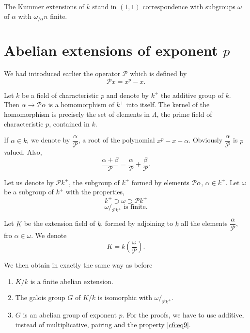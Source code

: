\begin{thm}\label{c6:thm14}%
The Kummer extensions of $k$ stand in $(1,1)$ correspondence with
  subgroups $\omega$ of $\alpha$ with $\omega_{/{\alpha}}n$ finite. 
\end{thm}


\section{Abelian extensions of exponent \texorpdfstring{$p$}{p}}\label{c6:s7}\pageoriginale %

We had introduced earlier the operator $\mathscr{P}$ which is defined
by 
$$
\mathscr{P} x =x^p-x. 
$$

Let $k$ be a field of characteristic $p$ and denote by $k^+$ the
additive group of $k$. Then $\alpha \to \mathscr{P} \alpha$ is a
homomorphism of $k^+$ into itself. The kernel of the homomorphism is
precisely the set of elements in $\Lambda$, the prime field of
characteristic $p$, contained in $k$. 

If $\alpha \in k$, we denote by $\dfrac{\alpha}{\mathscr{P}}$, a root
of the polynomial $x^p-x- \alpha$. Obviously
$\dfrac{\alpha}{\mathscr{P}}$ is $p$ valued. Also, 
\begin{equation*}
\frac{\alpha+ \beta}{\mathscr{P}}=\frac{\alpha}{\mathscr{P}}+\frac{
  \beta}{\mathscr{P}}. \tag{9}\label{c6:eq9} 
\end{equation*}

Let us denote by $\mathscr{P}k^+$, the subgroup of $k^+$ formed by
elements $\mathscr{P} \alpha$, $\alpha \in k^+$. Let $\omega$ be a
subgroup of $k^+$ with the properties, 
$$
k^+ \supset \omega \supset \mathscr{P} k^+
$$
$$
\omega/_{\mathscr{P} k^+} \text{ is finite}.
$$

Let $K$ be the extension field of $k$, formed by adjoining to $k$ all
the elements $\dfrac{\alpha}{\mathscr{P}}$, fro $\alpha \in
\omega$. We denote 
$$
K=k(\frac{\omega}{\mathscr{P}}).
$$

We then obtain in exactly the same way as before 
\begin{enumerate}[1)]
\item $K/k$ is a finite abelian extension. 

\item The galois group $G$ of $K/k$ is isomorphic with
  $\omega/_{\mathscr{P} k^+}$. 

 \item $G$ is an abelian group of exponent $p$. For the proofs, we
   have to use additive, instead of multiplicative, pairing and the
   property \eqref{c6:eq9}. 
\end{enumerate}

